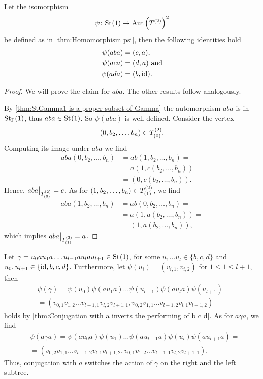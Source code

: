 \begin{thm}\label{thm:Conjugation with a inverts the performing of b c d}
Let the isomorphism
\begin{equation*}
\psi\colon\St{1}\to\AutT^2
\end{equation*}
be defined as in \cref{thm:Homomorphism psi}, then the following identities hold
\begin{align*}
\psi(aba)&=(c,a),\\
\psi(aca)&=(d,a) \text{ and}\\
\psi(ada)&=(b,\id).
\end{align*}
\end{thm}
\begin{proof}
We will prove the claim for $aba$. The other results follow analogously.

By \cref{thm:StGamma1 is a proper subset of Gamma} the automorphism $aba$ is in $\St[\Gamma]{1}$, thus $aba\in\St{1}$. So $\psi(aba)$ is well-defined. Consider the vertex
\begin{equation*}
(0,b_2,\ldots,b_n)\in\ST{(0)}.
\end{equation*}
Computing its image under $aba$ we find
\begin{align*}
aba(0,b_2,\ldots,b_n)&=ab(1,b_2,\ldots,b_n)=\\
&=a(1,c(b_2,\ldots,b_n))=\\
&=(0,c(b_2,\ldots,b_n)).
\end{align*}
Hence, $aba\big\vert_{\ST{(0)}}=c$. As for $(1,b_2,\ldots,b_n)\in\ST{(1)}$, we find
\begin{align*}
aba(1,b_2,\ldots,b_n)&=ab(0,b_2,\ldots,b_n)=\\
&=a(1,a(b_2,\ldots,b_n))=\\
&=(1,a(b_2,\ldots,b_n)),
\end{align*}
which implies $aba\big\vert_{\ST{(1)}}=a$.
\end{proof}
\begin{rem}
Let $\gamma=u_0au_1a\ldots u_{l-1}au_lau_{l+1}\in\St{1}$, for some $u_1\ldots u_{l}\in\lbrace b,c,d\rbrace$ and $u_0,u_{l+1}\in\lbrace \id,b,c,d\rbrace.$ Furthermore, let $\psi(u_i)=(v_{i,1},v_{i,2})$ for $1\leq 1\leq l+1$, then 
\begin{align*}
&\psi(\gamma)	=\psi(u_0)\psi(au_1a)\ldots\psi(u_{l-1})\psi(au_la)\psi(u_{l+1})=\\
			&=(v_{0,1}v_{1,2}\ldots v_{l-1,1}v_{l,2}v_{l+1,1},v_{0,2}v_{1,1}\ldots v_{l-1,2}v_{l,1}v_{l+1,2})
\end{align*}
holds by \cref{thm:Conjugation with a inverts the performing of b c d}. As for $a\gamma a$, we find
\begin{align*}
&\psi(a\gamma a)	=\psi(au_0a)\psi(u_1)\ldots\psi(au_{l-1}a)\psi(u_l)\psi(au_{l+1}a)=\\
			&=(v_{0,2}v_{1,1}\ldots v_{l-1,2}v_{l,1}v_{l+1,2},v_{0,1}v_{1,2}\ldots v_{l-1,1}v_{l,2}v_{l+1,1}).
\end{align*}
Thus, conjugation with $a$ switches the action of $\gamma$ on the right and the left subtree.
\end{rem}
